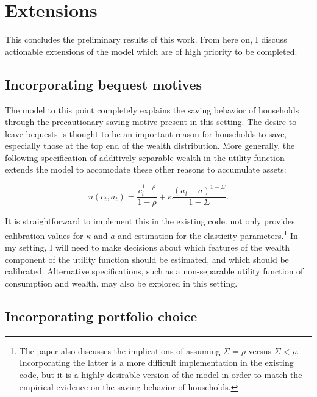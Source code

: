 \documentclass[\econtexRoot/Chp1proposal]{subfiles}
\begin{document}
\hypertarget{extensions}{}
\section{Extensions}\notinsubfile{\label{sec:extensions}}

This concludes the preliminary results of this work. From here on, I discuss actionable extensions of the model which are of high priority to be completed.

\subsection{Incorporating bequest motives}

\par The model to this point completely explains the saving behavior of households through the precautionary saving motive present in this setting. The desire to leave bequests is thought to be an important reason for households to save, especially those at the top end of the wealth distribution. More generally, the following specification of additively separable wealth in the utility function extends the model to accomodate these other reasons to accumulate assets:

$$u(c_t, a_t) = \frac{c_{t}^{1-\rho}}{1-\rho} + \kappa \frac{(a_{t}-\underbar{a})^{1-\Sigma}}{1-\Sigma}.$$

\par It is straightforward to implement this in the existing code. \cite{ls2019} not only provides calibration values for $\kappa$ and $\underbar{a}$ and estimation for the elasticity parameters.\footnote{The paper also discusses the implications of assuming $\Sigma = \rho$ versus $\Sigma < \rho$. Incorporating the latter is a more difficult implementation in the existing code, but it is a highly desirable version of the model in order to match the empirical evidence on the saving behavior of households.} In my setting, I will need to make decisions about which features of the wealth component of the utility function should be estimated, and which should be calibrated. Alternative specifications, such as a non-separable utility function of consumption and wealth, may also be explored in this setting.

\subsection{Incorporating portfolio choice}
\end{document}
